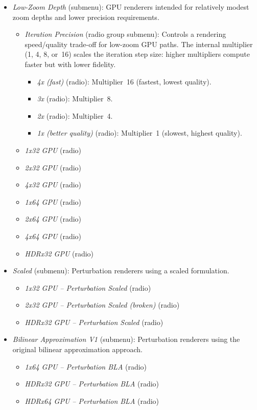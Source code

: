 \begin{itemize}
\begin{itemize}
      \item \emph{Low-Zoom Depth} (submenu): GPU renderers intended for relatively modest zoom depths and lower precision requirements.
        \begin{itemize}
          \item \emph{Iteration Precision} (radio group submenu): Controls a
          rendering speed/quality trade-off for low-zoom GPU paths.  The
          internal multiplier (1, 4, 8, or~16) scales the iteration step size:
          higher multipliers compute faster but with lower fidelity.
            \begin{itemize}
              \item \emph{4x (fast)} (radio): Multiplier~16 (fastest, lowest quality).
              \item \emph{3x} (radio): Multiplier~8.
              \item \emph{2x} (radio): Multiplier~4.
              \item \emph{1x (better quality)} (radio): Multiplier~1 (slowest, highest quality).
            \end{itemize}

          \item \emph{1x32 GPU} (radio)
          \item \emph{2x32 GPU} (radio)
          \item \emph{4x32 GPU} (radio)
          \item \emph{1x64 GPU} (radio)
          \item \emph{2x64 GPU} (radio)
          \item \emph{4x64 GPU} (radio)
          \item \emph{HDRx32 GPU} (radio)
        \end{itemize}

      \item \emph{Scaled} (submenu): Perturbation renderers using a scaled formulation.
        \begin{itemize}
          \item \emph{1x32 GPU -- Perturbation Scaled} (radio)
          \item \emph{2x32 GPU -- Perturbation Scaled (broken)} (radio)
          \item \emph{HDRx32 GPU -- Perturbation Scaled} (radio)
        \end{itemize}

      \item \emph{Bilinear Approximation V1} (submenu): Perturbation renderers using the original bilinear approximation approach.
        \begin{itemize}
          \item \emph{1x64 GPU -- Perturbation BLA} (radio)
          \item \emph{HDRx32 GPU -- Perturbation BLA} (radio)
          \item \emph{HDRx64 GPU -- Perturbation BLA} (radio)
        \end{itemize}


\end{itemize}
\end{itemize}
